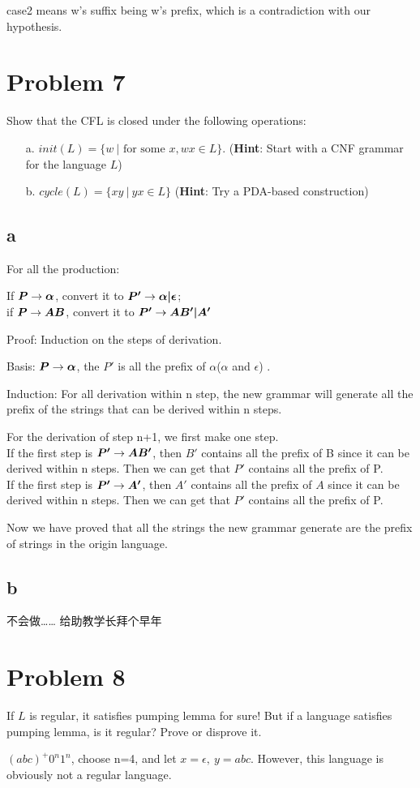 \documentclass[a4paper,UTF8]{ctexart}
\theoremstyle{definition}
\begin{document}
case2 means w's suffix being w's prefix, which is a contradiction with our hypothesis.




\section*{Problem 7}
Show that the CFL is closed under the following operations:
\begin{enumerate}
	\item[a.] $init(L)=\{w\ |\mbox{ for some }x, wx \in L\}$. (\textbf{Hint}: Start with a CNF grammar for the language $L$)
	\item[b.] $cycle(L)=\{xy\ |\ yx \in L\}$ (\textbf{Hint}: Try a PDA-based construction)
\end{enumerate}

\subsection*{a}

For all the production: 

If $\boldsymbol{P} \rightarrow \boldsymbol{\alpha}$, convert it to $\boldsymbol{P'} \rightarrow \boldsymbol{\alpha|\epsilon}$;\\
if $\boldsymbol{P} \rightarrow \boldsymbol{AB}$, convert it to $\boldsymbol{P'} \rightarrow \boldsymbol{AB'|A'}$

Proof:
Induction on the steps of derivation. 

Basis: $\boldsymbol{P} \rightarrow \boldsymbol{\alpha}$, the $P'$ is all the prefix of $\alpha$($\alpha$ and $\epsilon$) .

Induction:
	For all derivation within n step, the new grammar will generate all the prefix
	of the strings that can be derived within n steps. 

	For the derivation of step n+1, we first make one step.\\
	If the first step is $\boldsymbol{P'} \rightarrow \boldsymbol{AB'}$, then $B'$ contains all the prefix of B since it
	can be derived within n steps. Then we can get that $P'$ contains all the 
	prefix of P.\\
	If the first step is $\boldsymbol{P'} \rightarrow \boldsymbol{A'}$, then $A'$ contains all the prefix of 
	$A$ since it can be derived within n steps. Then we can get that $P'$ contains all
	the prefix of P.

	Now we have proved that all the strings the new grammar generate are the prefix of strings 
	in the origin language.

\subsection*{b}

不会做…… 给助教学长拜个早年


\section*{Problem 8}
If $L$ is regular, it satisfies pumping lemma for sure! But if a language satisfies pumping lemma, is it regular? Prove or disprove it.

$(abc)^+0^n1^n$, choose n=4, and let $x=\epsilon,\ y=abc$. However, this language is obviously not 
a regular language.
\end{document}
